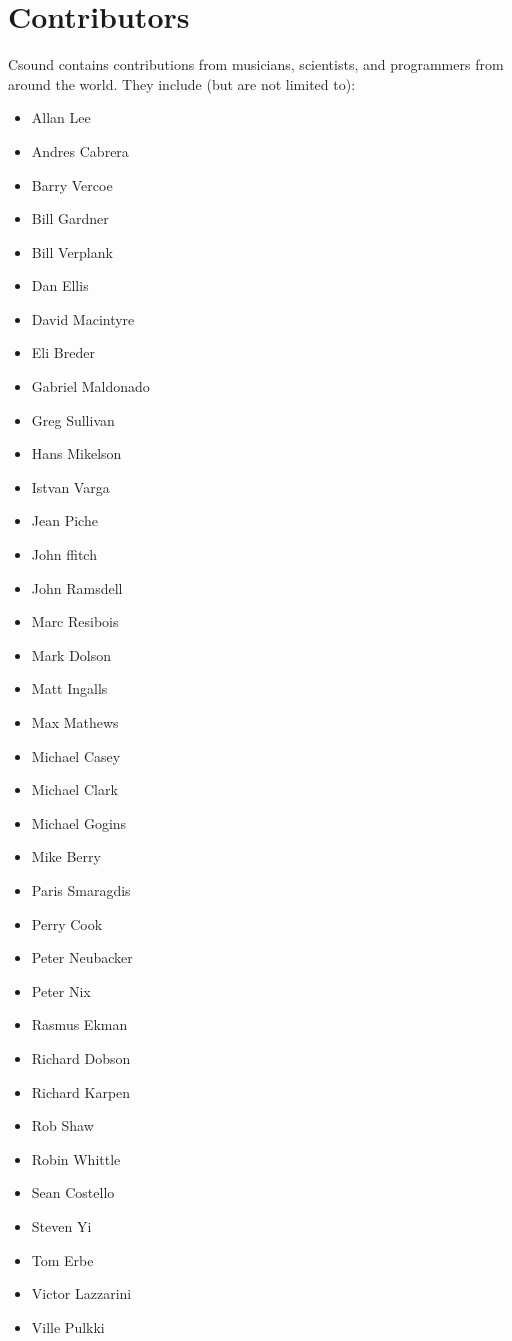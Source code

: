 \documentclass[10pt,letterpaper,onecolumn]{book}
\begin{document}
\section{Contributors}
Csound contains contributions from musicians, scientists, and programmers from around the world. They include (but are not limited to): 
\begin{itemize}
\item Allan Lee 
\item Andres Cabrera
\item Barry Vercoe
\item Bill Gardner 
\item Bill Verplank 
\item Dan Ellis 
\item David Macintyre 
\item Eli Breder 
\item Gabriel Maldonado  
\item Greg Sullivan 
\item Hans Mikelson 
\item Istvan Varga 
\item Jean Piche 
\item John ffitch 
\item John Ramsdell 
\item Marc Resibois 
\item Mark Dolson 
\item Matt Ingalls 
\item Max Mathews 
\item Michael Casey 
\item Michael Clark 
\item Michael Gogins 
\item Mike Berry 
\item Paris Smaragdis 
\item Perry Cook 
\item Peter Neubacker 
\item Peter Nix 
\item Rasmus Ekman 
\item Richard Dobson 
\item Richard Karpen 
\item Rob Shaw 
\item Robin Whittle 
\item Sean Costello 
\item Steven Yi 
\item Tom Erbe 
\item Victor Lazzarini  
\item Ville Pulkki 
\end{itemize}
\end{document}
